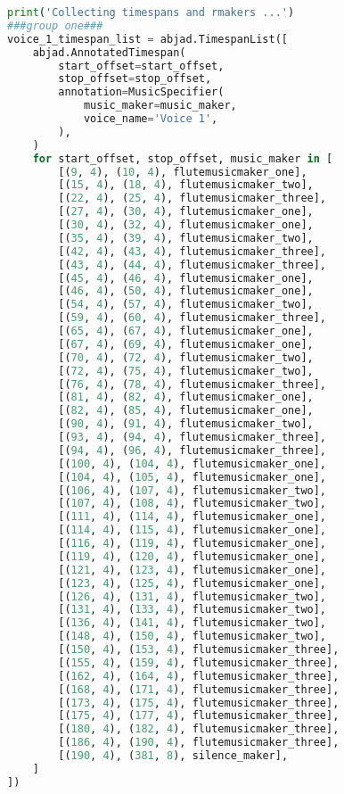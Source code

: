 \begin{lstlisting}[language=Python, caption=Tianshu Segment\_IV]
print('Collecting timespans and rmakers ...')
###group one###
voice_1_timespan_list = abjad.TimespanList([
    abjad.AnnotatedTimespan(
        start_offset=start_offset,
        stop_offset=stop_offset,
        annotation=MusicSpecifier(
            music_maker=music_maker,
            voice_name='Voice 1',
        ),
    )
    for start_offset, stop_offset, music_maker in [
        [(9, 4), (10, 4), flutemusicmaker_one],
        [(15, 4), (18, 4), flutemusicmaker_two],
        [(22, 4), (25, 4), flutemusicmaker_three],
        [(27, 4), (30, 4), flutemusicmaker_one],
        [(30, 4), (32, 4), flutemusicmaker_one],
        [(35, 4), (39, 4), flutemusicmaker_two],
        [(42, 4), (43, 4), flutemusicmaker_three],
        [(43, 4), (44, 4), flutemusicmaker_three],
        [(45, 4), (46, 4), flutemusicmaker_one],
        [(46, 4), (50, 4), flutemusicmaker_one],
        [(54, 4), (57, 4), flutemusicmaker_two],
        [(59, 4), (60, 4), flutemusicmaker_three],
        [(65, 4), (67, 4), flutemusicmaker_one],
        [(67, 4), (69, 4), flutemusicmaker_one],
        [(70, 4), (72, 4), flutemusicmaker_two],
        [(72, 4), (75, 4), flutemusicmaker_two],
        [(76, 4), (78, 4), flutemusicmaker_three],
        [(81, 4), (82, 4), flutemusicmaker_one],
        [(82, 4), (85, 4), flutemusicmaker_one],
        [(90, 4), (91, 4), flutemusicmaker_two],
        [(93, 4), (94, 4), flutemusicmaker_three],
        [(94, 4), (96, 4), flutemusicmaker_three],
        [(100, 4), (104, 4), flutemusicmaker_one],
        [(104, 4), (105, 4), flutemusicmaker_one],
        [(106, 4), (107, 4), flutemusicmaker_two],
        [(107, 4), (108, 4), flutemusicmaker_two],
        [(111, 4), (114, 4), flutemusicmaker_one],
        [(114, 4), (115, 4), flutemusicmaker_one],
        [(116, 4), (119, 4), flutemusicmaker_one],
        [(119, 4), (120, 4), flutemusicmaker_one],
        [(121, 4), (123, 4), flutemusicmaker_one],
        [(123, 4), (125, 4), flutemusicmaker_one],
        [(126, 4), (131, 4), flutemusicmaker_two],
        [(131, 4), (133, 4), flutemusicmaker_two],
        [(136, 4), (141, 4), flutemusicmaker_two],
        [(148, 4), (150, 4), flutemusicmaker_two],
        [(150, 4), (153, 4), flutemusicmaker_three],
        [(155, 4), (159, 4), flutemusicmaker_three],
        [(162, 4), (164, 4), flutemusicmaker_three],
        [(168, 4), (171, 4), flutemusicmaker_three],
        [(173, 4), (175, 4), flutemusicmaker_three],
        [(175, 4), (177, 4), flutemusicmaker_three],
        [(180, 4), (182, 4), flutemusicmaker_three],
        [(186, 4), (190, 4), flutemusicmaker_three],
        [(190, 4), (381, 8), silence_maker],
    ]
])


\end{lstlisting}
